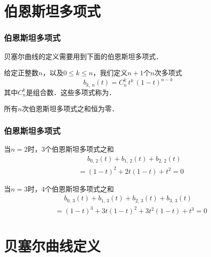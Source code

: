 \documentclass[14pt,notheorems,leqno,xcolor={rgb}]{beamer} %
\begin{document}
\section{伯恩斯坦多项式}

\begin{frame}
\frametitle{伯恩斯坦多项式}
贝塞尔曲线的定义需要用到下面的伯恩斯坦多项式．
\vpause
\begin{definition*}
给定正整数$n$，以及$0\le k \le n$，我们定义$n+1$个$n$次多项式
\[ b_{k,\,n}(t) = C_n^k\, t^k\, (1-t)^{n-k} \]
其中$C_n^k$是组合数．这些多项式称为．
\end{definition*}
\vpause
\begin{property*}
所有$n$次伯恩斯坦多项式之和恒为零．
\end{property*}
\end{frame}

\begin{frame}
\frametitle{伯恩斯坦多项式}
\begin{example}
当$n=2$时，$3$个伯恩斯坦多项式之和
\begin{align*}
&\phantom{{}={}} b_{0,\,2}(t) + b_{1,\,2}(t) + b_{2,\,2}(t) \\
&= (1-t)^2 + 2t(1-t) + t^2 = 0 
\end{align*}
\end{example}
\vpause
\begin{example}
当$n=3$时，$4$个伯恩斯坦多项式之和
\begin{align*}
&\phantom{{}={}} b_{0,\,3}(t) + b_{1,\,3}(t) + b_{2,\,3}(t) + b_{3,\,3}(t) \\
&= (1-t)^3 + 3t(1-t)^2 + 3t^2(1-t) + t^3 = 0
\end{align*}
\end{example}
\end{frame}

\section{贝塞尔曲线定义}
\end{document}
